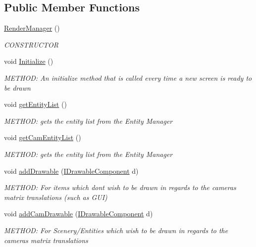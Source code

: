 \subsection*{Public Member Functions}
\begin{DoxyCompactItemize}
\item 
\hyperlink{a00526_a0ecca32f070bd247added2b680fe390d}{Render\+Manager} ()
\begin{DoxyCompactList}\small\item\em C\+O\+N\+S\+T\+R\+U\+C\+T\+OR \end{DoxyCompactList}\item 
void \hyperlink{a00526_abd794ae4c12392323e9afda73e459bef}{Initialize} ()
\begin{DoxyCompactList}\small\item\em M\+E\+T\+H\+OD\+: An initialize method that is called every time a new screen is ready to be drawn \end{DoxyCompactList}\item 
void \hyperlink{a00526_aeb436300e604d81ff837227e5dd11710}{get\+Entity\+List} ()
\begin{DoxyCompactList}\small\item\em M\+E\+T\+H\+OD\+: gets the entity list from the Entity Manager \end{DoxyCompactList}\item 
void \hyperlink{a00526_a79fb84c735ca8b863eed41f51566f554}{get\+Cam\+Entity\+List} ()
\begin{DoxyCompactList}\small\item\em M\+E\+T\+H\+OD\+: gets the entity list from the Entity Manager \end{DoxyCompactList}\item 
void \hyperlink{a00526_a6f4d9756fcf88b78263f0bc5538b1912}{add\+Drawable} (\hyperlink{a00454}{I\+Drawable\+Component} d)
\begin{DoxyCompactList}\small\item\em M\+E\+T\+H\+OD\+: For items which dont wish to be drawn in regards to the cameras matrix translations (such as G\+UI) \end{DoxyCompactList}\item 
void \hyperlink{a00526_abe4458f6b030cffba170149d1ee63bba}{add\+Cam\+Drawable} (\hyperlink{a00454}{I\+Drawable\+Component} d)
\begin{DoxyCompactList}\small\item\em M\+E\+T\+H\+OD\+: For Scenery/\+Entities which wish to be drawn in regards to the cameras matrix translations \end{DoxyCompactList}\item 

\end{DoxyCompactItemize}
